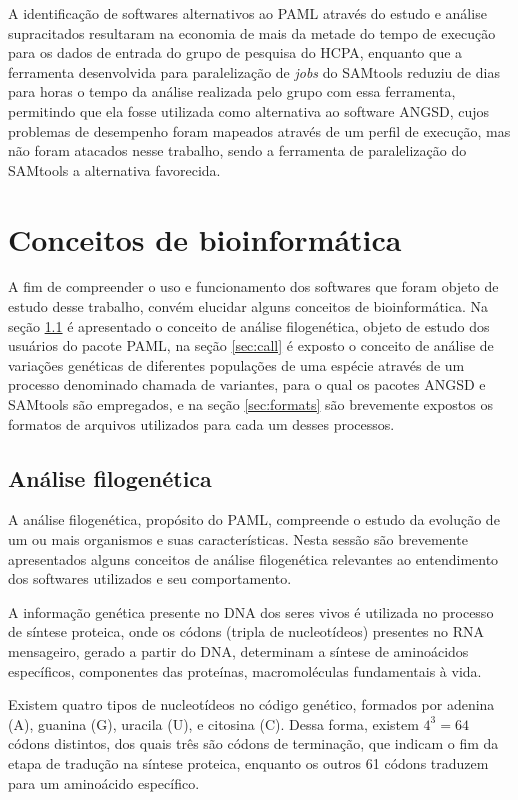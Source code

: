 \documentclass[cic,tc]{iiufrgs}
\begin{document}
A identificação de softwares alternativos ao PAML através do estudo e análise
supracitados resultaram na economia de mais da metade do tempo de execução para
os dados de entrada do grupo de pesquisa do HCPA, enquanto que a ferramenta
desenvolvida para paralelização de \textit{jobs} do SAMtools reduziu de dias
para horas o tempo da análise realizada pelo grupo com essa ferramenta,
permitindo que ela fosse utilizada como alternativa ao software ANGSD, cujos
problemas de desempenho foram mapeados através de um perfil de execução, mas
não foram atacados nesse trabalho, sendo a ferramenta de paralelização do
SAMtools a alternativa favorecida.

\section{Conceitos de bioinformática}

A fim de compreender o uso e funcionamento dos softwares que foram objeto de
estudo desse trabalho, convém elucidar alguns conceitos de bioinformática. Na
seção \ref{sec:filo} é apresentado o conceito de análise filogenética, objeto
de estudo dos usuários do pacote PAML, na seção \ref{sec:call} é exposto o
conceito de análise de variações genéticas de diferentes populações de uma
espécie através de um processo denominado chamada de variantes, para o qual os
pacotes ANGSD e SAMtools são empregados, e na seção \ref{sec:formats} são
brevemente expostos os formatos de arquivos utilizados para cada um desses
processos.

\subsection{Análise filogenética}
\label{sec:filo}

A análise filogenética, propósito do PAML, compreende o estudo da evolução de
um ou mais organismos e suas características. Nesta sessão são brevemente
apresentados alguns conceitos de análise filogenética relevantes ao
entendimento dos softwares utilizados e seu comportamento.

A informação genética presente no DNA dos seres vivos é utilizada no processo
de síntese proteica, onde os códons (tripla de nucleotídeos) presentes no RNA
mensageiro, gerado a partir do DNA, determinam a síntese de aminoácidos
específicos, componentes das proteínas, macromoléculas fundamentais à vida.

Existem quatro tipos de nucleotídeos no código genético, formados por adenina
(A), guanina (G), uracila (U), e citosina (C). Dessa forma, existem $4^3 = 64$
códons distintos, dos quais três são códons de terminação, que indicam o fim da
etapa de tradução na síntese proteica, enquanto os outros 61 códons traduzem
para um aminoácido específico.
\end{document}
